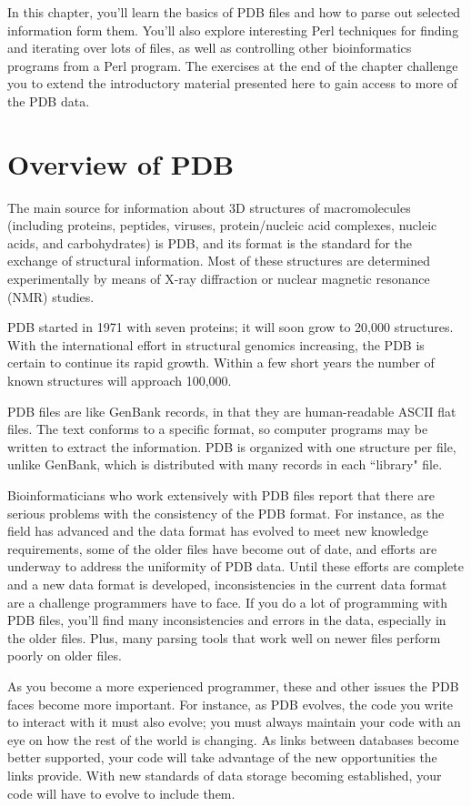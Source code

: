 In this chapter, you'll learn the basics of PDB files and how to parse out selected information form them. You'll also explore interesting Perl techniques for finding and iterating over lots of files, as well as controlling other bioinformatics programs from a Perl program. The exercises at the end of the chapter challenge you to extend the introductory material presented here to gain access to more of the PDB data.

\section{Overview of PDB}
The main source for information about 3D structures of macromolecules (including proteins, peptides, viruses, protein/nucleic acid complexes, nucleic acids, and carbohydrates) is PDB, and its format is the  standard for the exchange of structural information. Most of these structures are determined experimentally by means of X-ray diffraction or nuclear magnetic resonance (NMR) studies.

PDB started in 1971 with seven proteins; it will soon grow to 20,000 structures. With the international effort in structural genomics increasing, the PDB is certain to continue its rapid growth. Within a few short years the number of known structures will approach 100,000.  

PDB files are like GenBank records, in that they are human-readable ASCII flat files. The text conforms to a specific format, so computer programs may be written to extract the information. PDB is organized with one structure per file, unlike GenBank, which is distributed with many records in each ``library" file.

Bioinformaticians who work extensively with PDB files report that there are serious problems with the consistency of the PDB format. For instance, as the field has advanced and the data format has evolved to meet new knowledge requirements, some of the older files have become out of date, and efforts are underway to address the uniformity of PDB data. Until these efforts are complete and a new data format is developed, inconsistencies in the current data format are a challenge programmers have to face. If you do a lot of programming with PDB files, you'll find many inconsistencies and errors in the data, especially in the older files. Plus, many parsing tools that work well on newer files perform poorly on older files.

As you become a more experienced programmer, these and other issues the PDB faces become more important. For instance, as PDB evolves, the code you write to interact with it must also evolve; you must always maintain your code with an eye on how the rest of the world is changing. As links between databases become better supported, your code will take advantage of the new opportunities the links provide. With new standards of data storage becoming established, your code will have to evolve to include them.


